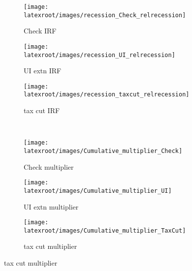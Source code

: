 \documentclass{econsocart}
\begin{document}
\vspace{1em}
\FloatBarrier %

\begin{figure}[H] %
  \centering
  \caption{Policy effectiveness during recessions with aggregate demand effects}
  \label{fig:Policyrelrecession} 
  \noindent\begin{minipage}{\textwidth}
    \centering
    \begin{subfigure}[b]{.32\linewidth}
      \centering
      \texttt{[image: \\latexroot/images/recession\_Check\_relrecession]}
      \caption{Check IRF}
      \label{fig:recessioncheckrelrecession} 
    \end{subfigure}
    \hfill%
    \begin{subfigure}[b]{.32\linewidth}
      \centering
      \texttt{[image: \\latexroot/images/recession\_UI\_relrecession]}
      \caption{UI extn IRF}
      \label{fig:recessionuirelrecession} 
    \end{subfigure}
    \hfill%
    \begin{subfigure}[b]{.32\linewidth}
      \centering
      \texttt{[image: \\latexroot/images/recession\_taxcut\_relrecession]}
      \caption{tax cut IRF}
      \label{fig:recessiontaxcutrelrecession} 
    \end{subfigure}
    \\[1.5em]
    \begin{subfigure}[b]{.32\linewidth}
      \centering
      \texttt{[image: \\latexroot/images/Cumulative\_multiplier\_Check]}
      \caption{Check multiplier}
      \label{fig:recessioncheckrelrecession_Mult} 
    \end{subfigure}
    \hfill%
    \begin{subfigure}[b]{.32\linewidth}
      \centering
      \texttt{[image: \\latexroot/images/Cumulative\_multiplier\_UI]}
      \caption{UI extn multiplier}
      \label{fig:recessionuirelrecession_Mult} 
    \end{subfigure}
    \hfill%
    \begin{subfigure}[b]{.32\linewidth}
      \centering
      \texttt{[image: \\latexroot/images/Cumulative\_multiplier\_TaxCut]}
      \caption{tax cut multiplier}
      \label{fig:recessiontaxcutrelrecession_Mult} 
    \end{subfigure}
  \end{minipage}
\end{figure}
\end{document}
